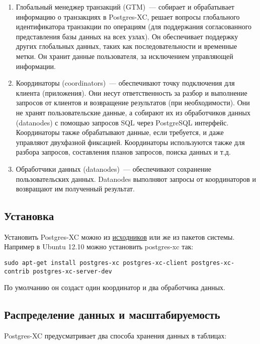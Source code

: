 \begin{enumerate}
\item Глобальный менеджер транзакций (GTM)~--- собирает и обрабатывает информацию о транзакциях в Postgres-XC, решает вопросы глобального идентификатора транзакции по операциям (для поддержания согласованного представления базы данных на всех узлах). Он обеспечивает поддержку других глобальных данных, таких как последовательности и временные метки. Он хранит данные пользователя, за исключением управляющей информации.
\item Координаторы (coordinators)~--- обеспечивают точку подключения для клиента (приложения). Они несут ответственность за разбор и выполнение запросов от клиентов и возвращение результатов (при необходимости). Они не хранят пользовательские данные, а собирают их из обработчиков данных (datanodes) с помощью запросов SQL через PostgreSQL интерфейс. Координаторы также обрабатывают данные, если требуется, и даже управляют двухфазной фиксацией. Координаторы используются также для разбора запросов, составления планов запросов, поиска данных и т.д.
\item Обработчики данных (datanodes)~--- обеспечивают сохранение пользовательских данных. Datanodes выполняют запросы от координаторов и возвращают им полученный результат.
\end{enumerate}

\subsection{Установка}

Установить Postgres-XC можно из \href{http://postgres-xc.sourceforge.net/docs/1_0/install-short.html}{исходников} или же из пакетов системы. Например в Ubuntu 12.10 можно установить postgres-xc так:

\begin{lstlisting}[label=lst:postgres-xc1,caption=Установка Postgres-XC]
sudo apt-get install postgres-xc postgres-xc-client postgres-xc-contrib postgres-xc-server-dev
\end{lstlisting}

По умолчанию он создаст один координатор и два обработчика данных.

\subsection{Распределение данных и масштабируемость}

Postgres-XC предусматривает два способа хранения данных в таблицах:

